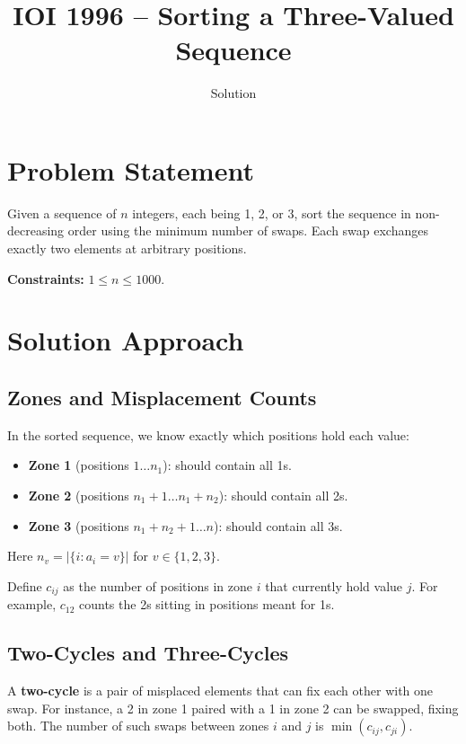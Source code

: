 \documentclass[11pt,a4paper]{article}
\title{IOI 1996 -- Sorting a Three-Valued Sequence}
\author{Solution}
\date{}
\begin{document}
\maketitle

\section{Problem Statement}

Given a sequence of $n$ integers, each being 1, 2, or 3, sort the sequence in
non-decreasing order using the minimum number of swaps. Each swap exchanges exactly
two elements at arbitrary positions.

\medskip
\noindent\textbf{Constraints:} $1 \le n \le 1000$.

\section{Solution Approach}

\subsection{Zones and Misplacement Counts}

In the sorted sequence, we know exactly which positions hold each value:
\begin{itemize}
  \item \textbf{Zone 1} (positions $1 \ldots n_1$): should contain all 1s.
  \item \textbf{Zone 2} (positions $n_1{+}1 \ldots n_1{+}n_2$): should contain all 2s.
  \item \textbf{Zone 3} (positions $n_1{+}n_2{+}1 \ldots n$): should contain all 3s.
\end{itemize}
Here $n_v = |\{i : a_i = v\}|$ for $v \in \{1,2,3\}$.

Define $c_{ij}$ as the number of positions in zone $i$ that currently hold value $j$.
For example, $c_{12}$ counts the 2s sitting in positions meant for 1s.

\subsection{Two-Cycles and Three-Cycles}

A \textbf{two-cycle} is a pair of misplaced elements that can fix each other with one swap.
For instance, a 2 in zone 1 paired with a 1 in zone 2 can be swapped, fixing both.
The number of such swaps between zones $i$ and $j$ is $\min(c_{ij}, c_{ji})$.
\end{document}
